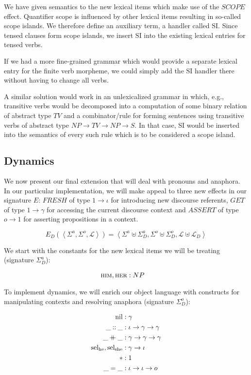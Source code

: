 \documentclass{article}
\newcommand{\cons}{\mathbin{::}}
\newcommand{\cat}{\mathbin{+\mkern-10mu+}}
\newcommand{\abs}[1]{\textsc{#1}}
\begin{document}
We have given semantics to the new lexical items which make use of the
$SCOPE$ effect. Quantifier scope is influenced by other lexical items
resulting in so-called scope islands. We therefore define an auxiliary
term, a handler called $\mathrm{SI}$. Since tensed clauses form scope
islands, we insert $\mathrm{SI}$ into the existing lexical entries
for tensed verbs.

If we had a more fine-grained grammar which would provide a separate
lexical entry for the finite verb morpheme, we could simply add the
$\mathrm{SI}$ handler there without having to change all verbs.

A similar solution would work in an unlexicalized grammar in which, e.g.,
transitive verbs would be decomposed into a computation of some binary
relation of abstract type $TV$ and a combinator/rule for forming sentences
using transitive verbs of abstract type $NP \to TV \to NP \to S$. In that
case, $\mathrm{SI}$ would be inserted into the semantics of every
such rule which is to be considered a scope island.

\subsection{Dynamics}

We now present our final extension that will deal with pronouns and
anaphora. In our particular implementation, we will make appeal to three
new effects in our signature $E$: $FRESH$ of type $1 \to \iota$ for
introducing new discourse referents, $GET$ of type $1 \to \gamma$ for
accessing the current discourse context and $ASSERT$ of type $o \to 1$ for
asserting propositions in a context.

$$
E_D(\left< \Sigma^a, \Sigma^o, \mathcal{L} \right>) = \left< \Sigma^a \uplus \Sigma^a_D, \Sigma^o \uplus \Sigma^o_D, \mathcal{L} \uplus \mathcal{L}_D \right>
$$

We start with the constants for the new lexical items we will be treating
(signature $\Sigma^a_D$):

\begin{align*}
  \abs{him}, \abs{her} &: NP
\end{align*}

To implement dynamics, we will enrich our object language with constructs
for manipulating contexts and resolving anaphora (signature $\Sigma^o_D$):

\begin{align*}
  \mathrm{nil} &: \gamma \\
  \_ \cons \_ &: \iota \to \gamma \to \gamma \\
  \_ \cat \_ &: \gamma \to \gamma \to \gamma \\
  \mathrm{sel_{he}}, \mathrm{sel_{she}}  &: \gamma \to \iota \\
  * &: 1 \\
  \_ = \_ &: \iota \to \iota \to o
\end{align*}
\end{document}
